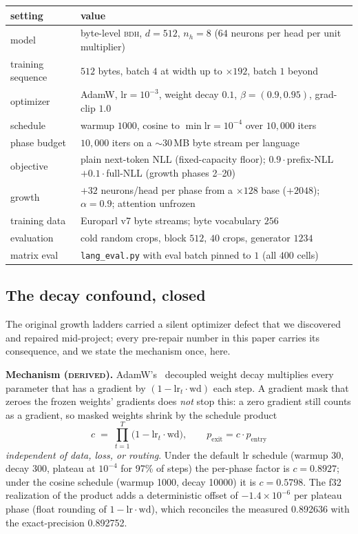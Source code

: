 \documentclass[11pt]{article}
\theoremstyle{definition}\newtheorem{definition}{Definition}
\theoremstyle{remark}\newtheorem{remark}{Remark}
\newcommand{\BDH}{\textsc{bdh}}
\begin{document}
\begin{center}\small
\begin{tabular}{ll}
\toprule
setting & value \\
\midrule
model & byte-level \BDH{}, $d=512$, $n_h=8$ ($64$ neurons per head per unit multiplier) \\
training sequence & $512$ bytes, batch $4$ at width up to $\times192$, batch $1$ beyond \\
optimizer & AdamW, $\mathrm{lr}=10^{-3}$, weight decay $0.1$, $\beta=(0.9,0.95)$, grad-clip $1.0$ \\
schedule & warmup $1000$, cosine to $\min\mathrm{lr}=10^{-4}$ over $10{,}000$ iters \\
phase budget & $10{,}000$ iters on a $\sim$30\,MB byte stream per language \\
objective & plain next-token NLL (fixed-capacity floor); $0.9\cdot$prefix-NLL $+0.1\cdot$full-NLL (growth phases 2--20) \\
growth & $+32$ neurons/head per phase from a $\times128$ base ($+2048$); $\alpha=0.9$; attention unfrozen \\
training data & Europarl v7 byte streams; byte vocabulary $256$ \\
evaluation & cold random crops, block $512$, $40$ crops, generator $1234$ \\
matrix eval & \texttt{lang\_eval.py} with eval batch pinned to $1$ (all $400$ cells) \\
\bottomrule
\end{tabular}
\end{center}

\subsection{The decay confound, closed}\label{sec:decay}

The original growth ladders carried a silent optimizer defect that we discovered and
repaired mid-project; every pre-repair number in this paper carries its consequence, and we
state the mechanism once, here.

\textbf{Mechanism (\textsc{derived}).} AdamW's~\cite{adamw} decoupled weight decay multiplies every
parameter that has a gradient by $(1-\mathrm{lr}_t\cdot\mathrm{wd})$ each step. A gradient
mask that zeroes the frozen weights' gradients does \emph{not} stop this: a zero gradient
still counts as a gradient, so masked weights shrink by the schedule product
\[
c \;=\; \prod_{t=1}^{T}\bigl(1-\mathrm{lr}_t\cdot\mathrm{wd}\bigr),
\qquad
p_{\text{exit}} = c\cdot p_{\text{entry}}
\]
\emph{independent of data, loss, or routing}. Under the default lr schedule
(warmup 30, decay 300, plateau at $10^{-4}$ for 97\% of steps) the per-phase factor is
$c=0.8927$; under the cosine schedule (warmup 1000, decay 10000) it is $c=0.5798$. The f32
realization of the product adds a deterministic offset of $-1.4\times10^{-6}$ per plateau
phase (float rounding of $1-\mathrm{lr}\cdot\mathrm{wd}$), which reconciles the measured
0.892636 with the exact-precision 0.892752.
\end{document}
